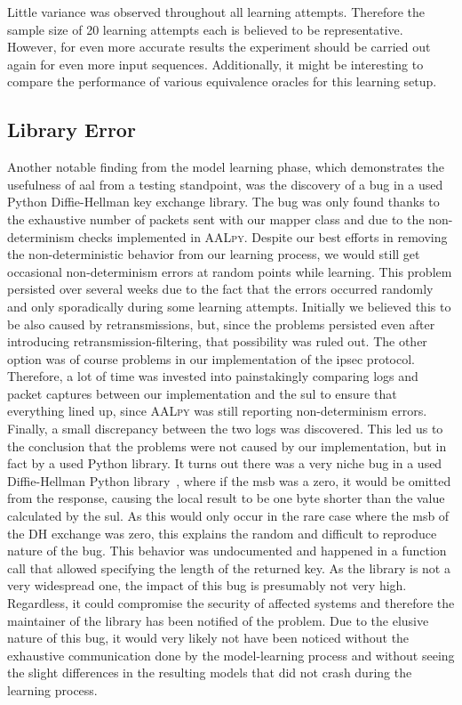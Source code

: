 Little variance was observed throughout all learning attempts. Therefore the sample size of 20 learning attempts each is believed to be representative. However, for even more accurate results the experiment should be carried out again for even more input sequences. Additionally, it might be interesting to compare the performance of various equivalence oracles for this learning setup.

\subsection{Library Error} \label{subsec:liberror}
Another notable finding from the model learning phase, which demonstrates the usefulness of \ac{aal} from a testing standpoint, was the discovery of a bug in a used Python Diffie-Hellman key exchange library. The bug was only found thanks to the exhaustive number of packets sent with our mapper class and due to the non-determinism checks implemented in \textsc{AALpy}. Despite our best efforts in removing the non-deterministic behavior from our learning process, we would still get occasional non-determinism errors at random points while learning. This problem persisted over several weeks due to the fact that the errors occurred randomly and only sporadically during some learning attempts. Initially we believed this to be also caused by retransmissions, but, since the problems persisted even after introducing retransmission-filtering, that possibility was ruled out. The other option was of course problems in our implementation of the \ac{ipsec} protocol. Therefore, a lot of time was invested into painstakingly comparing logs and packet captures between our implementation and the \ac{sul} to ensure that everything lined up, since \textsc{AALpy} was still reporting non-determinism errors. Finally, a small discrepancy between the two logs was discovered. This led us to the conclusion that the problems were not caused by our implementation, but in fact by a used Python library. It turns out there was a very niche bug in a used Diffie-Hellman Python library~\cite{topdappdh}, where if the \ac{msb} was a zero, it would be omitted from the response, causing the local result to be one byte shorter than the value calculated by the \ac{sul}. As this would only occur in the rare case where the \ac{msb} of the DH exchange was zero, this explains the random and difficult to reproduce nature of the bug. This behavior was undocumented and happened in a function call that allowed specifying the length of the returned key. As the library is not a very widespread one, the impact of this bug is presumably not very high. Regardless, it could compromise the security of affected systems and therefore the maintainer of the library has been notified of the problem. Due to the elusive nature of this bug, it would very likely not have been noticed without the exhaustive communication done by the model-learning process and without seeing the slight differences in the resulting models that did not crash during the learning process.
\newpage

